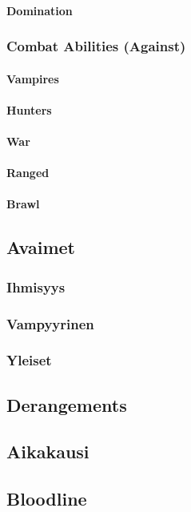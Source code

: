 \documentclass[a4paper, 12pt, finnish]{article}
\begin{document}
{			\paragraph{Domination}
		\subsubsection{Combat Abilities (Against)}
			\paragraph{Vampires}
			\paragraph{Hunters}
			\paragraph{War}
			\paragraph{Ranged}
			\paragraph{Brawl}
	\subsection{Avaimet}
		\subsubsection{Ihmisyys}
		\subsubsection{Vampyyrinen}
		\subsubsection{Yleiset}
	\subsection{Derangements}
	\subsection{Aikakausi}
	\subsection{Bloodline}
}
\end{document}
